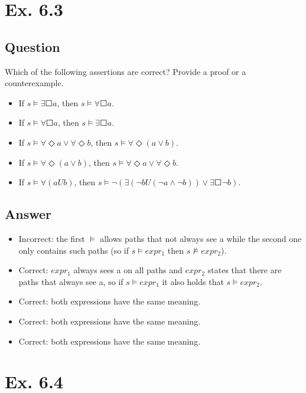 \documentclass[12pt]{article}
\begin{document}
\newpage
\section*{Ex. 6.3}
\subsection*{Question}
Which of the following assertions are correct? Provide a proof or a counterexample.
\begin{itemize}
	\item If $s\models\exists\Square a$, then $s\models\forall\Square a$.
	\item If $s\models\forall\Square a$, then $s\models\exists\Square a$.
	\item If $s\models\forall\Diamond a\vee\forall\Diamond b$, then $s\models\forall\Diamond(a\vee b)$.
	\item If $s\models\forall\Diamond(a\vee b)$, then $s\models\forall\Diamond a\vee \forall\Diamond b$.
	\item If $s\models\forall(aUb)$, then $s\models\neg(\exists(\neg bU(\neg a\wedge\neg b))\vee\exists\Square\neg b)$.
\end{itemize}

\subsection*{Answer}
\begin{itemize}
	\item Incorrect: the first $\models$ allows paths that not always see a while the second one only contains such paths (so if $s \models expr_1$ then $s \not\models expr_2$).
	\item Correct: $expr_1$ always sees a on all paths and $expr_2$ states that there are paths that always see a, so if $s\models expr_1$ it also holds that $s\models expr_2$.
	\item Correct: both expressions have the same meaning.
	\item Correct: both expressions have the same meaning.
	\item Correct: both expressions have the same meaning.
\end{itemize}

\newpage
\section*{Ex. 6.4}
\end{document}

